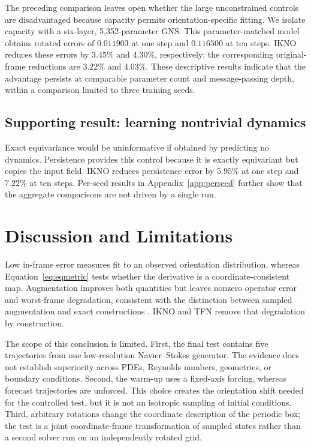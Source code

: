 \documentclass[mlmain]{jmlr}
\newcommand{\IKNO}{\textsc{IKNO}}
\begin{document}
The preceding comparison leaves open whether the large unconstrained controls
are disadvantaged because capacity permits orientation-specific fitting. We
isolate capacity with a six-layer, 5,352-parameter GNS. This parameter-matched
model obtains rotated errors of $0.011903$ at one step and $0.116500$ at ten
steps. \IKNO{} reduces these errors by $3.45\%$ and $4.30\%$, respectively;
the corresponding original-frame reductions are $3.22\%$ and $4.03\%$.
These descriptive results indicate that the advantage persists at comparable
parameter count and message-passing depth, within a comparison limited to
three training seeds.

\subsection{Supporting result: learning nontrivial dynamics}

Exact equivariance would be uninformative if obtained by predicting no
dynamics. Persistence provides this control because it is exactly equivariant
but copies the input field. \IKNO{} reduces persistence error by $5.95\%$ at
one step and $7.22\%$ at ten steps. Per-seed results in
Appendix~\ref{app:perseed} further show that the aggregate comparisons are not
driven by a single run.

\section{Discussion and Limitations}
\label{sec:discussion}

Low in-frame error measures fit to an observed orientation distribution,
whereas Equation~\ref{eq:eqmetric} tests whether the derivative is a
coordinate-consistent map. Augmentation improves both quantities but leaves
nonzero operator error and worst-frame degradation, consistent with the
distinction between sampled augmentation and exact constructions
\citep{brandstetter2022lie,puny2022frame}. \IKNO{} and TFN remove that
degradation by construction.

The scope of this conclusion is limited. First, the final test contains five
trajectories from one low-resolution Navier--Stokes generator. The evidence
does not establish superiority across PDEs, Reynolds numbers, geometries, or
boundary conditions. Second, the warm-up uses a fixed-axis forcing, whereas
forecast trajectories are unforced. This choice creates the orientation shift
needed for the controlled test, but it is not an isotropic sampling of initial
conditions. Third, arbitrary rotations change the coordinate description of
the periodic box; the test is a joint coordinate-frame transformation of
sampled states rather than a second solver run on an independently rotated
grid.
\end{document}
